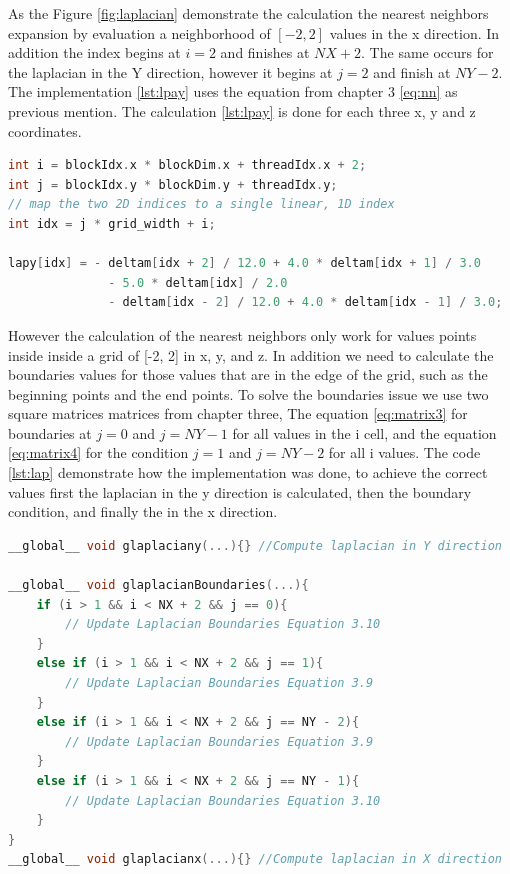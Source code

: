 As the Figure \ref{fig:laplacian} demonstrate the calculation the nearest neighbors expansion by evaluation a neighborhood of $[-2, 2]$ values in the x direction. In addition the index begins at $i = 2$ and finishes at $NX + 2$. The same occurs for the laplacian in the Y direction, however it begins at $j = 2$ and finish at $NY -2$.  The implementation \ref{lst:lpay} uses the equation from chapter 3 \ref{eq:nn} as previous mention. The calculation \ref{lst:lpay} is done for each three x, y and z coordinates. 

\begin{lstlisting}[language=C++, label={lst:lpay}, caption={Laplacian X using global memory}]
int i = blockIdx.x * blockDim.x + threadIdx.x + 2;
int j = blockIdx.y * blockDim.y + threadIdx.y;
// map the two 2D indices to a single linear, 1D index
int idx = j * grid_width + i;

lapy[idx] = - deltam[idx + 2] / 12.0 + 4.0 * deltam[idx + 1] / 3.0
			  - 5.0 * deltam[idx] / 2.0
			  - deltam[idx - 2] / 12.0 + 4.0 * deltam[idx - 1] / 3.0;	
\end{lstlisting}


However the calculation of the nearest neighbors only work for values points inside  inside a grid of [-2, 2] in x, y, and z. In addition we need to calculate the boundaries values for those values that are in the edge of the grid, such as the beginning points and the end points. To solve the boundaries issue we use two square matrices matrices from chapter three, The equation \ref{eq:matrix3} for boundaries at $j = 0$ and $j = NY - 1$ for all values in the i cell, and the equation \ref{eq:matrix4} for the condition $j = 1$ and $j = NY - 2$ for all i values. The code \ref{lst:lap} demonstrate how the implementation was done, to achieve the correct values first the laplacian in the y direction is calculated, then the boundary condition, and finally the in the x direction. 

\begin{lstlisting}[language=C++, label={lst:lap}, caption={Evaluation of Laplacian X, Y with boundary condition}]
__global__ void glaplaciany(...){} //Compute laplacian in Y direction

__global__ void glaplacianBoundaries(...){
    if (i > 1 && i < NX + 2 && j == 0){
     	// Update Laplacian Boundaries Equation 3.10
    }
    else if (i > 1 && i < NX + 2 && j == 1){
  		// Update Laplacian Boundaries Equation 3.9
    }
    else if (i > 1 && i < NX + 2 && j == NY - 2){
        // Update Laplacian Boundaries Equation 3.9
    }
    else if (i > 1 && i < NX + 2 && j == NY - 1){
        // Update Laplacian Boundaries Equation 3.10
    }
}
__global__ void glaplacianx(...){} //Compute laplacian in X direction
\end{lstlisting}

